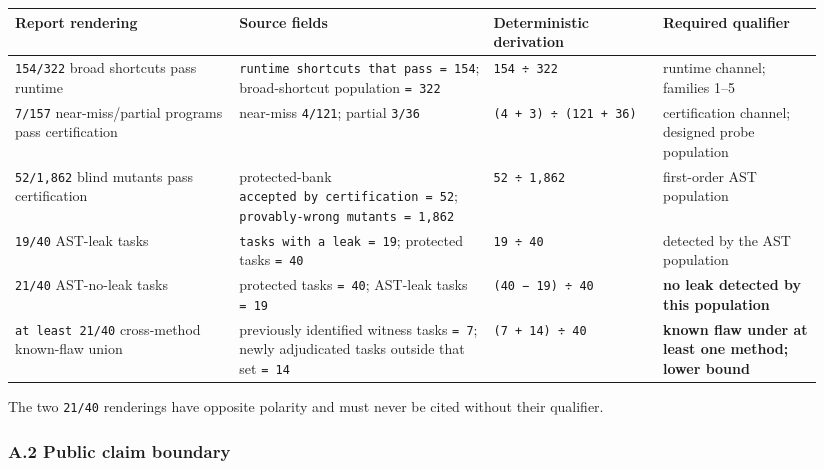 \documentclass[
]{article}
\newcounter{none} %
\begin{document}
{\def\LTcaptype{none} %
\begin{longtable}[]{@{}p{0.28\linewidth}p{0.25\linewidth}p{0.21\linewidth}p{0.20\linewidth}@{}}
\toprule\noalign{}
Report rendering & Source fields & Deterministic derivation & Required
qualifier \\
\midrule\noalign{}
\endhead
\bottomrule\noalign{}
\endlastfoot
\texttt{154/322} broad shortcuts pass runtime &
\texttt{runtime\ shortcuts\ that\ pass\ =\ 154}; broad-shortcut
population \texttt{=\ 322} & \texttt{154\ ÷\ 322} & runtime channel;
families 1--5 \\
\texttt{7/157} near-miss/partial programs pass certification & near-miss
\texttt{4/121}; partial \texttt{3/36} &
\texttt{(4\ +\ 3)\ ÷\ (121\ +\ 36)} & certification channel; designed
probe population \\
\texttt{52/1,862} blind mutants pass certification & protected-bank
\texttt{accepted\ by\ certification\ =\ 52};
\texttt{provably-wrong\ mutants\ =\ 1,862} & \texttt{52\ ÷\ 1,862} &
first-order AST population \\
\texttt{19/40} AST-leak tasks & \texttt{tasks\ with\ a\ leak\ =\ 19};
protected tasks \texttt{=\ 40} & \texttt{19\ ÷\ 40} & detected by the
AST population \\
\texttt{21/40} AST-no-leak tasks & protected tasks \texttt{=\ 40};
AST-leak tasks \texttt{=\ 19} & \texttt{(40\ −\ 19)\ ÷\ 40} & \textbf{no
leak detected by this population} \\
\texttt{at\ least\ 21/40} cross-method known-flaw union & previously
identified witness tasks \texttt{=\ 7}; newly adjudicated tasks outside
that set \texttt{=\ 14} & \texttt{(7\ +\ 14)\ ÷\ 40} & \textbf{known
flaw under at least one method; lower bound} \\
\end{longtable}
}

The two \texttt{21/40} renderings have opposite polarity and must never
be cited without their qualifier.

\subsubsection{A.2 Public claim
boundary}\label{a2-public-claim-boundary}
\end{document}
